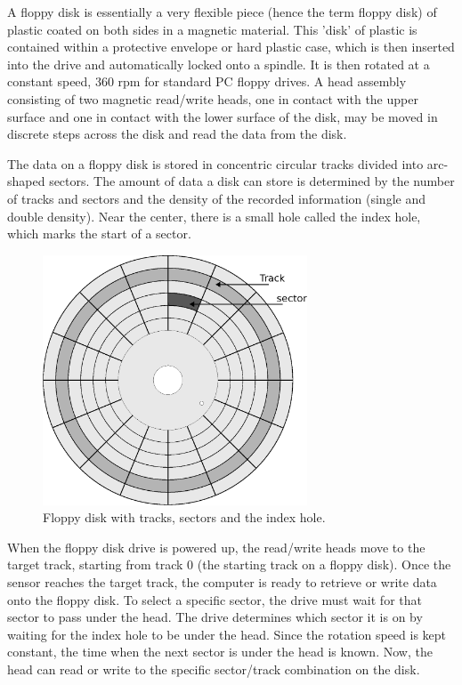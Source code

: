 \documentclass[book.tex]{subfiles}
\begin{document}
A floppy disk is essentially a very flexible piece (hence the term floppy disk) of plastic coated on both sides in a magnetic material. This 'disk' of plastic is contained within a protective envelope or hard plastic case, which is then inserted into the drive and automatically locked onto a spindle. It is then rotated at a constant speed, 360 rpm for standard PC floppy drives. A head assembly consisting of two magnetic read/write heads, one in contact with the upper surface and one in contact with the lower surface of the disk, may be moved in discrete steps across the disk and read the data from the disk.\\

\par
The data on a floppy disk is stored in concentric circular tracks divided into arc-shaped sectors. The amount of data a disk can store is determined by the number of tracks and sectors and the density of the recorded information (single and double density). Near the center, there is a small hole called the index hole, which marks the start of a sector.\\

\begin{figure}[H]
\centering
      \includegraphics[width=0.7\textwidth]{imgs/drawings/floppy_disk.eps}
      \caption{Floppy disk with tracks, sectors and the index hole.}
\end{figure}

\par
When the floppy disk drive is powered up, the read/write heads move to the target track, starting from track 0 (the starting track on a floppy disk). Once the sensor reaches the target track, the computer is ready to retrieve or write data onto the floppy disk. To select a specific sector, the drive must wait for that sector to pass under the head. The drive determines which sector it is on by waiting for the index hole to be under the head. Since the rotation speed is kept constant, the time when the next sector is under the head is known. Now, the head can read or write to the specific sector/track combination on the disk.\\
\end{document}
